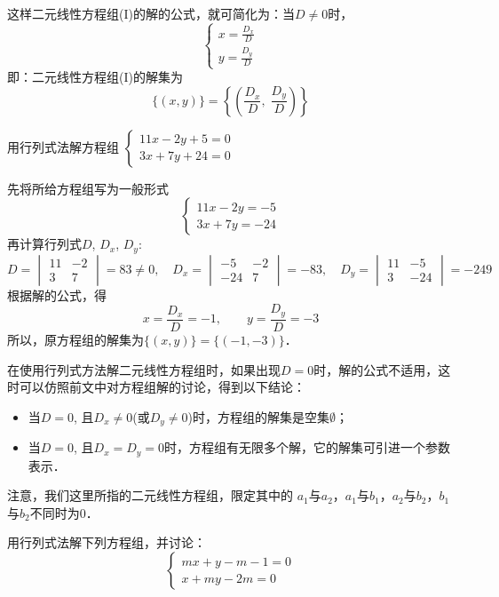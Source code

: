 这样二元线性方程组(I)的解的公式，就可简化为：当$D\ne 0$时，
\[\begin{cases}
    x=\frac{D_x}{D}\\y=\frac{D_y}{D}
\end{cases}\]
即：二元线性方程组(I)的解集为
\[\{(x,y)\}=\left\{\left(\frac{D_x}{D},\; \frac{D_y}{D}\right)\right\}\]

\begin{example}
    用行列式法解方程组
    $\begin{cases}
11x-2y+5=0\\
3x+7y+24=0        
    \end{cases}$
\end{example}

\begin{solution}
    先将所给方程组写为一般形式
\[\begin{cases}
    11x-2y=-5\\
    3x+7y=-24
\end{cases}\]
再计算行列式$D$, $D_x$, $D_y$:
\[D=\begin{vmatrix}
    11&-2\\3&7
\end{vmatrix}=83\ne 0,\quad  D_x=\begin{vmatrix}
    -5&-2\\-24&7
\end{vmatrix}=-83,\quad  D_y=\begin{vmatrix}
    11&-5\\3&-24
\end{vmatrix}=-249\]
根据解的公式，得
\[x=\frac{D_x}{D}=-1,\qquad y=\frac{D_y}{D}=-3\]
所以，原方程组的解集为$\{(x,y)\}=\{(-1,-3)\}$．
\end{solution}

在使用行列式方法解二元线性方程组时，如果出现$D=0$时，解的公式不适用，这时可以仿照前文中对方程组解的讨论，得到以下结论：
\begin{itemize}
    \item 当$D=0$, 且$D_x\ne 0$(或$D_y\ne 0$)时，方程组的解集是空集$\emptyset$；
    \item 当$D=0$, 且$D_x=D_y=0$时，方程组有无限多个解，它的解集可引进一个参数表示．
\end{itemize}

注意，我们这里所指的二元线性方程组，限定其中的
$a_1$与$a_2$，$a_1$与$b_1$，$a_2$与$b_2$，$b_1$与$b_2$不同时为0．

\begin{example}
    用行列式法解下列方程组，并讨论：
    \[\begin{cases}
        mx+y-m-1=0\\
        x+my-2m=0   
    \end{cases}\]
   \end{example}
   
